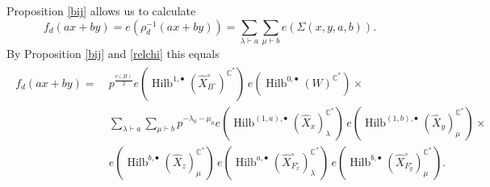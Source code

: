 \documentclass{amsart}
\theoremstyle{definition}
\newcommand{\CC} {\mathbb{C}}          %
\newcommand{\Hilb}{\operatorname{Hilb}}
\begin{document}
Proposition \ref{bij} allows us to calculate 
$$
f_d(ax+by) = e(\rho_{d}^{-1}(ax+by)) = \sum_{\lambda \vdash a} \sum_{\mu \vdash b} e(\Sigma(x,y,a,b)).
$$
By Proposition \ref{bij} and \eqref{relchi} this equals
\begin{align}
\begin{split} \label{fdintermediate}
f_d(ax+by) = \ &p^{\frac{e(B)}{2}} e(\Hilb^{1,\bullet}(\widehat{X}^{\circ}_{B^{\circ}})^{\CC^*}) \, e(\Hilb^{0,\bullet}(W)^{\CC^*}) \times \\
&\sum_{\lambda \vdash a} \sum_{\mu \vdash b} p^{- \lambda_0 - \mu_0 } e(\Hilb^{(1,a),\bullet}(\widehat{X}_{x})_{\lambda}^{\CC^*}) \, e(\Hilb^{(1,b),\bullet}(\widehat{X}_{y})_{\mu}^{\CC^*}) \times \\
&e(\Hilb^{b,\bullet}(\widehat{X}_{z})_{\mu}^{\CC^*}) \, e(\Hilb^{a,\bullet}(\widehat{X}^{\circ}_{F_{x}^{\circ}})_{\lambda}^{\CC^*}) \, e(\Hilb^{b,\bullet}(\widehat{X}^{\circ}_{F_{y}^{\circ}})_{\mu}^{\CC^*}).
\end{split}
\end{align}
\end{document}
